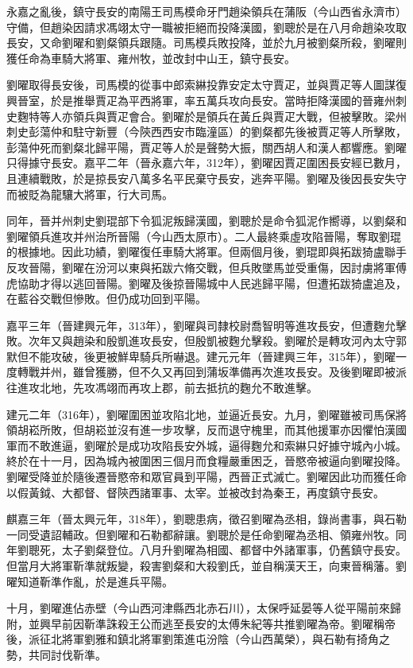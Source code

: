 永嘉之亂後，鎮守長安的南陽王司馬模命牙門趙染領兵在蒲阪（今山西省永濟市）守備，但趙染因請求馮翊太守一職被拒絕而投降漢國，劉聰於是在八月命趙染攻取長安，又命劉曜和劉粲領兵跟隨。司馬模兵敗投降，並於九月被劉粲所殺，劉曜則獲任命為車騎大將軍、雍州牧，並改封中山王，鎮守長安。

劉曜取得長安後，司馬模的從事中郎索綝投靠安定太守賈疋，並與賈疋等人圖謀復興晉室，於是推舉賈疋為平西將軍，率五萬兵攻向長安。當時拒降漢國的晉雍州刺史麴特等人亦領兵與賈疋會合。劉曜於是領兵在黃丘與賈疋大戰，但被擊敗。梁州刺史彭蕩仲和駐守新豐（今陝西西安市臨潼區）的劉粲都先後被賈疋等人所擊敗，彭蕩仲死而劉粲北歸平陽，賈疋等人於是聲勢大振，關西胡人和漢人都響應。劉曜只得據守長安。嘉平二年（晉永嘉六年，312年），劉曜因賈疋圍困長安經已數月，且連續戰敗，於是掠長安八萬多名平民棄守長安，逃奔平陽。劉曜及後因長安失守而被貶為龍驤大將軍，行大司馬。

同年，晉并州刺史劉琨部下令狐泥叛歸漢國，劉聰於是命令狐泥作嚮導，以劉粲和劉曜領兵進攻并州治所晉陽（今山西太原市）。二人最終乘虛攻陷晉陽，奪取劉琨的根據地。因此功績，劉曜復任車騎大將軍。但兩個月後，劉琨即與拓跋猗盧聯手反攻晉陽，劉曜在汾河以東與拓跋六脩交戰，但兵敗墜馬並受重傷，因討虜將軍傅虎協助才得以逃回晉陽。劉曜及後掠晉陽城中人民逃歸平陽，但遭拓跋猗盧追及，在藍谷交戰但慘敗。但仍成功回到平陽。

嘉平三年（晉建興元年，313年），劉曜與司隸校尉喬智明等進攻長安，但遭麴允擊敗。次年又與趙染和殷凱進攻長安，但殷凱被麴允擊殺。劉曜於是轉攻河內太守郭默但不能攻破，後更被鮮卑騎兵所嚇退。建元元年（晉建興三年，315年），劉曜一度轉戰并州，雖曾獲勝，但不久又再回到蒲坂準備再次進攻長安。及後劉曜即被派往進攻北地，先攻馮翊而再攻上郡，前去抵抗的麴允不敢進擊。

建元二年（316年），劉曜圍困並攻陷北地，並逼近長安。九月，劉曜雖被司馬保將領胡崧所敗，但胡崧並沒有進一步攻擊，反而退守槐里，而其他援軍亦因懼怕漢國軍而不敢進逼，劉曜於是成功攻陷長安外城，逼得麴允和索綝只好據守城內小城。終於在十一月，因為城內被圍困三個月而食糧嚴重困乏，晉愍帝被逼向劉曜投降。劉曜受降並於隨後遷晉愍帝和眾官員到平陽，西晉正式滅亡。劉曜因此功而獲任命以假黃鉞、大都督、督陝西諸軍事、太宰。並被改封為秦王，再度鎮守長安。

麒嘉三年（晉太興元年，318年），劉聰患病，徵召劉曜為丞相，錄尚書事，與石勒一同受遺詔輔政。但劉曜和石勒都辭讓。劉聰於是任命劉曜為丞相、領雍州牧。同年劉聰死，太子劉粲登位。八月升劉曜為相國、都督中外諸軍事，仍舊鎮守長安。但當月大將軍靳準就叛變，殺害劉粲和大殺劉氏，並自稱漢天王，向東晉稱藩。劉曜知道靳準作亂，於是進兵平陽。

十月，劉曜進佔赤壁（今山西河津縣西北赤石川），太保呼延晏等人從平陽前來歸附，並興早前因靳準誅殺王公而逃至長安的太傅朱紀等共推劉曜為帝。劉曜稱帝後，派征北將軍劉雅和鎮北將軍劉策進屯汾陰（今山西萬榮），與石勒有掎角之勢，共同討伐靳準。

